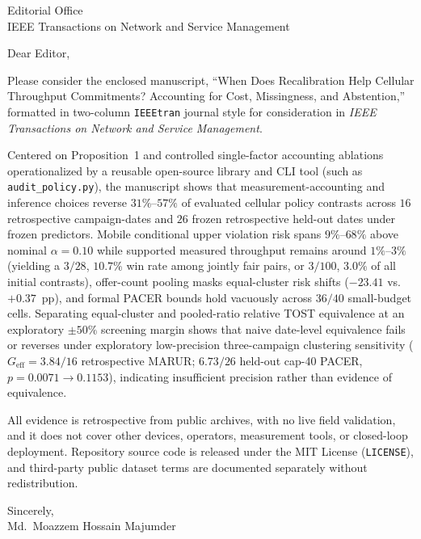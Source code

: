 \documentclass[11pt]{article}
\begin{document}
\thispagestyle{empty}
\noindent Editorial Office\\
IEEE Transactions on Network and Service Management

\bigskip
\noindent Dear Editor,

\bigskip
\noindent Please consider the enclosed manuscript, ``When Does Recalibration Help Cellular Throughput Commitments? Accounting for Cost, Missingness, and Abstention,'' formatted in two-column \texttt{IEEEtran} journal style for consideration in \emph{IEEE Transactions on Network and Service Management}.

\bigskip
\noindent Centered on Proposition~1 and controlled single-factor accounting ablations operationalized by a reusable open-source library and CLI tool (such as \texttt{audit\_policy.py}), the manuscript shows that measurement-accounting and inference choices reverse $31\%$--$57\%$ of evaluated cellular policy contrasts across $16$ retrospective campaign-dates and $26$ frozen retrospective held-out dates under frozen predictors. Mobile conditional upper violation risk spans $9\%$--$68\%$ above nominal $\alpha=0.10$ while supported measured throughput remains around $1\%$--$3\%$ (yielding a $3/28$, $10.7\%$ win rate among jointly fair pairs, or $3/100$, $3.0\%$ of all initial contrasts), offer-count pooling masks equal-cluster risk shifts ($-23.41$ vs.\ $+0.37$~pp), and formal PACER bounds hold vacuously across $36/40$ small-budget cells. Separating equal-cluster and pooled-ratio relative TOST equivalence at an exploratory $\pm 50\%$ screening margin shows that naive date-level equivalence fails or reverses under exploratory low-precision three-campaign clustering sensitivity ($G_{\text{eff}}=3.84/16$ retrospective MARUR; $6.73/26$ held-out cap-40 PACER, $p=0.0071 \to 0.1153$), indicating insufficient precision rather than evidence of equivalence.

\bigskip
\noindent All evidence is retrospective from public archives, with no live field validation, and it does not cover other devices, operators, measurement tools, or closed-loop deployment. Repository source code is released under the MIT License (\texttt{LICENSE}), and third-party public dataset terms are documented separately without redistribution.

\bigskip
\noindent Sincerely,\\
Md.\ Moazzem Hossain Majumder
\end{document}
